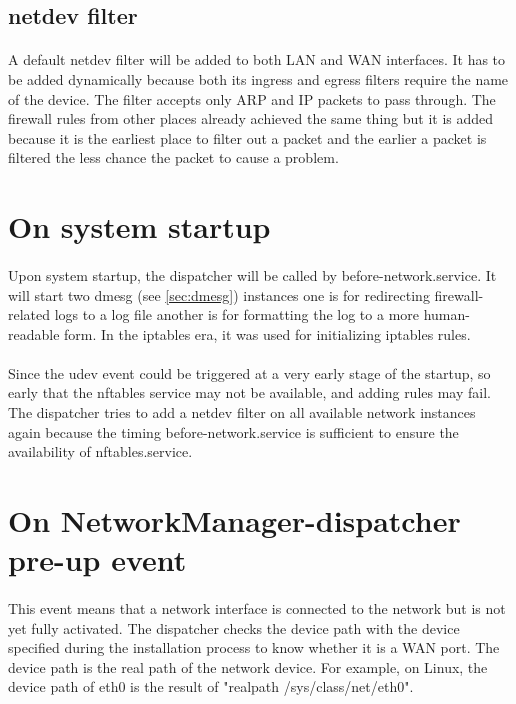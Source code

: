 \documentclass[mscthesis]{usiinfthesis}
\begin{document}
\subsection{netdev filter}
\paragraph{}
A default netdev filter will be added to both LAN and WAN interfaces. It has to be added dynamically because both its ingress and egress filters require the name of the device. The filter accepts only ARP and IP packets to pass through. The firewall rules from other places already achieved the same thing but it is added because it is the earliest place to filter out a packet and the earlier a packet is filtered the less chance the packet to cause a problem.

\section{On system startup}
\paragraph{}
Upon system startup, the dispatcher will be called by before-network.service. It will start two dmesg (see \cref{sec:dmesg}) instances one is for redirecting firewall-related logs to a log file another is for formatting the log to a more human-readable form. In the iptables era, it was used for initializing iptables rules.
\paragraph{}
Since the udev event could be triggered at a very early stage of the startup, so early that the nftables service may not be available, and adding rules may fail. The dispatcher tries to add a netdev filter on all available network instances again because the timing before-network.service is sufficient to ensure the availability of nftables.service.

\section{On NetworkManager-dispatcher pre-up event}
\paragraph{}
This event means that a network interface is connected to the network but is not yet fully activated. The dispatcher checks the device path with the device specified during the installation process to know whether it is a WAN port. The device path is the real path of the network device. For example, on Linux, the device path of eth0 is the result of "realpath /sys/class/net/eth0".
\end{document}
